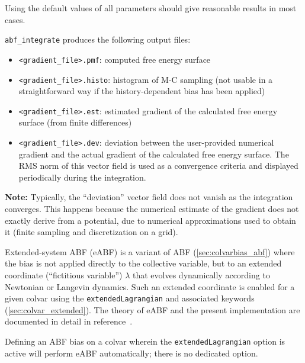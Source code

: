 Using the default values of all parameters should give reasonable results in most cases.

\bigskip
\texttt{abf\_integrate} produces the following output files:
\begin{itemize}
\setlength{\itemsep}{0pt}
\item \texttt{<gradient\_file>.pmf}: computed free energy surface
\item \texttt{<gradient\_file>.histo}: histogram of M-C sampling (not
usable in a straightforward way if the history-dependent bias has been applied)
\item \texttt{<gradient\_file>.est}: estimated gradient of the calculated free energy surface
(from finite differences)
\item \texttt{<gradient\_file>.dev}: deviation between the user-provided numerical gradient
and the actual gradient of the calculated free energy surface. The RMS norm of this vector
field is used as a convergence criteria and displayed periodically during the integration.
\end{itemize}

\textbf{Note:} Typically, the ``deviation'' vector field does not
vanish as the integration converges. This happens because the
numerical estimate of the gradient does not exactly derive from a
potential, due to numerical approximations used to obtain it (finite
sampling and discretization on a grid).



\label{sec:eABF}

Extended-system ABF (eABF) is a variant of ABF (\ref{sec:colvarbias_abf})
where the bias is not applied
directly to the collective variable, but to an extended coordinate  (``fictitious variable'')
$\lambda$ that evolves dynamically according to Newtonian or Langevin dynamics.
Such an extended coordinate is enabled for a given colvar using the
\texttt{extendedLagrangian} and associated keywords (\ref{sec:colvar_extended}).
The theory of eABF and the present implementation are documented in detail
in reference~\cite{Lesage2017}.

Defining an ABF bias on a colvar wherein the \texttt{extendedLagrangian} option
is active will perform eABF automatically; there is no dedicated option.

